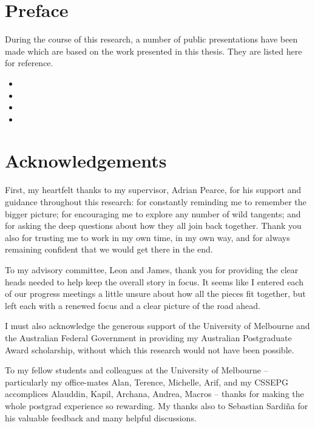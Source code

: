 \chapter*{Preface}
During the course of this research, a number of public presentations have been
 made which are based on the work presented in this thesis. They are listed
 here for reference.

\nobibliography*
\begin{itemize}
\item {}
\item {}
\item {}
\item {}
\end{itemize}


\chapter*{Acknowledgements} 

First, my heartfelt thanks to my supervisor, Adrian Pearce, for his support
and guidance throughout this research: for constantly reminding me to remember
the bigger picture; for encouraging me to explore any number of wild tangents; 
and for asking the deep questions about how they all join back together.
Thank you also for trusting me to work in my own time, in my own way, and for
always remaining confident that we would get there in the end.

To my advisory committee, Leon and James, thank you for providing the
clear heads needed to help keep the overall story in focus.  It seems like I
entered each of our progress meetings a little unsure about how all the pieces fit together, but left each with a renewed focus and a clear picture of the road ahead.

I must also acknowledge the generous support of the University of Melbourne
and the Australian Federal Government in providing my Australian Postgraduate
Award scholarship, without which this research would not have been possible.

To my fellow students and colleagues at the University of Melbourne -- particularly my office-mates Alan, Terence, Michelle, Arif, and my CSSEPG accomplices Alauddin, Kapil, Archana, Andrea, Macros -- thanks for making the whole postgrad
experience so rewarding. My thanks also to Sebastian Sardi\~na for his valuable feedback and many helpful discussions.

